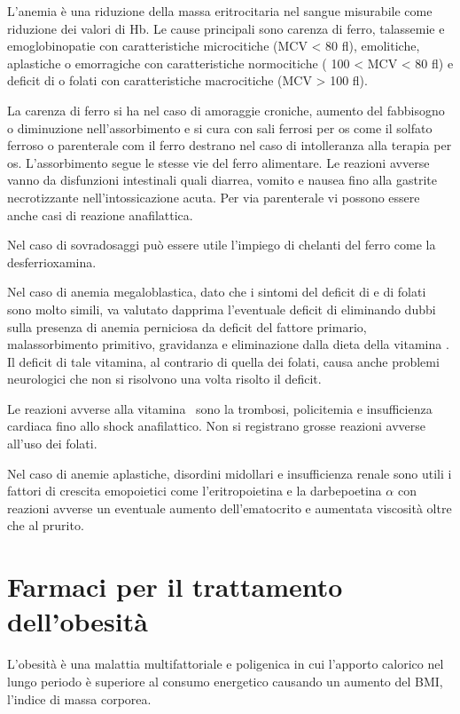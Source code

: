 L'anemia è una riduzione della massa eritrocitaria nel sangue misurabile come riduzione dei valori di Hb. Le cause principali sono carenza di ferro, talassemie e emoglobinopatie con caratteristiche microcitiche (MCV < 80 fl), emolitiche, aplastiche o emorragiche con caratteristiche normocitiche ( 100 < MCV < 80 fl) e deficit di  o folati con caratteristiche macrocitiche (MCV > 100 fl).

La carenza di ferro si ha nel caso di amoraggie croniche, aumento del fabbisogno o diminuzione nell'assorbimento e si cura con sali ferrosi per os come il solfato ferroso o parenterale com il ferro destrano nel caso di intolleranza alla terapia per os. L'assorbimento segue le stesse vie del ferro alimentare. Le reazioni avverse vanno da disfunzioni intestinali quali diarrea, vomito e nausea fino alla gastrite necrotizzante nell'intossicazione acuta. Per via parenterale vi possono essere anche casi di reazione anafilattica.

Nel caso di sovradosaggi può essere utile l'impiego di chelanti del ferro come la desferrioxamina.

Nel caso di anemia megaloblastica, dato che i sintomi del deficit di  e di folati sono molto simili, va valutato dapprima l'eventuale deficit di  eliminando dubbi sulla presenza di anemia perniciosa da deficit del fattore primario, malassorbimento primitivo, gravidanza e eliminazione dalla dieta della vitamina . Il deficit di tale vitamina, al contrario di quella dei folati, causa anche problemi neurologici che non si risolvono una volta risolto il deficit.

Le reazioni avverse alla vitamina~ sono la trombosi, policitemia e insufficienza cardiaca fino allo shock anafilattico. Non si registrano grosse reazioni avverse all'uso dei folati.

Nel caso di anemie aplastiche, disordini midollari e insufficienza renale sono utili i fattori di crescita emopoietici come l'eritropoietina e la darbepoetina $\alpha$ con reazioni avverse un eventuale aumento dell'ematocrito e aumentata viscosità oltre che al prurito.

\section{Farmaci per il trattamento dell'obesità}

L'obesità è una malattia multifattoriale e poligenica in cui l'apporto calorico nel lungo periodo è superiore al consumo energetico causando un aumento del BMI, l'indice di massa corporea.

